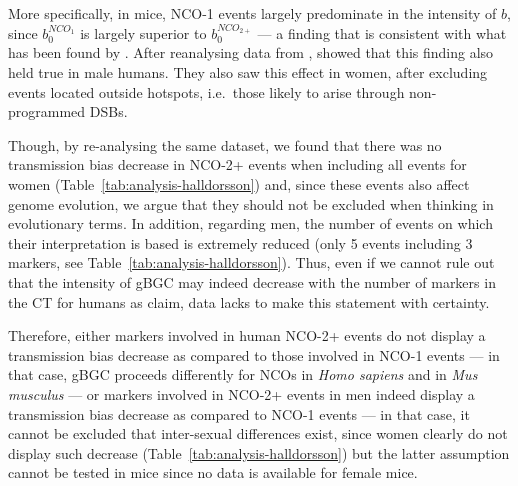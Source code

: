 More specifically, in mice, NCO-1 events largely predominate in the intensity of $b$, since $b_0^{NCO_1}$ is largely superior to $b_0^{NCO_{2+}}$ — a finding that is consistent with what has been found by \citet{li2018highresolution}.
After reanalysing data from \citet{halldorsson2016rate}, \citet{li2018highresolution} showed that this finding also held true in male humans.
They also saw this effect in women, after excluding events located outside hotspots, i.e.\ those likely to arise through non-programmed DSBs.

Though, by re-analysing the same dataset, we found that there was no transmission bias decrease in NCO-2+ events when including all events for women (Table~\ref{tab:analysis-halldorsson}) and, since these events also affect genome evolution, we argue that they should not be excluded when thinking in evolutionary terms.
In addition, regarding men, the number of events on which their interpretation is based is extremely reduced (only 5 events including 3 markers, see Table~\ref{tab:analysis-halldorsson}). 
Thus, even if we cannot rule out that the intensity of gBGC may indeed decrease with the number of markers in the CT for humans as \citet{li2018highresolution} claim, data lacks to make this statement with certainty.

Therefore, either markers involved in human NCO-2+ events do not display a transmission bias decrease as compared to those involved in NCO-1 events — in that case, gBGC proceeds differently for NCOs in \textit{Homo sapiens} and in \textit{Mus musculus} — or markers involved in NCO-2+ events in men indeed display a transmission bias decrease as compared to NCO-1 events — in that case, it cannot be excluded that inter-sexual differences exist, since women clearly do not display such decrease (Table~\ref{tab:analysis-halldorsson}) but the latter assumption cannot be tested in mice since no data is available for female mice.



